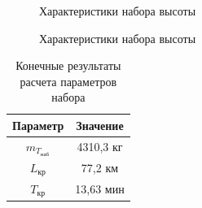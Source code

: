 \begin{figure}[H]
    \caption{Характеристики набора высоты}
    \label{fig:Характеристики набора высоты1}
\end{figure}

\begin{figure}[H]
    \caption{Характеристики набора высоты}
    \label{fig:Характеристики набора высоты2}
\end{figure}

\begin{table}[H]
    \centering
    \caption{Конечные результаты расчета параметров набора}
    \begin{tabular}{|c|c|}
    \hline
        Параметр & Значение \\ \hline
        $m_{T_\text{наб}}$ & 4310,3 кг\\ \hline
        $L_\text{кр}$ & 77,2 км\\ \hline
        $T_\text{кр}$ & 13,63 мин\\ \hline
    \end{tabular}
    \label{tab:Крейсер}
\end{table}


